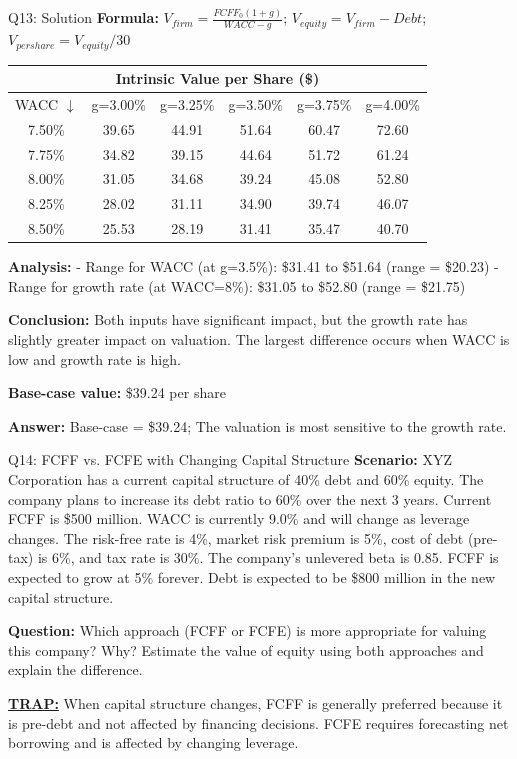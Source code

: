 \documentclass{beamer}
\renewcommand{\scriptsize}{\fontsize{6pt}{7pt}\selectfont}
\begin{document}
	\begin{frame}{Q13: Solution}
		\scriptsize
		\textbf{Formula:} $V_{firm} = \frac{FCFF_0(1+g)}{WACC-g}$; $V_{equity} = V_{firm} - Debt$; $V_{per share} = V_{equity}/30$
		
		\vspace{4pt}
		\begin{tabular}{c|c|c|c|c|c}
			\multicolumn{6}{c}{\textbf{Intrinsic Value per Share (\$)}} \\
			\hline
			WACC $\downarrow$ & g=3.00\% & g=3.25\% & g=3.50\% & g=3.75\% & g=4.00\% \\
			\hline
			7.50\% & 39.65 & 44.91 & 51.64 & 60.47 & 72.60 \\
			7.75\% & 34.82 & 39.15 & 44.64 & 51.72 & 61.24 \\
			8.00\% & 31.05 & 34.68 & 39.24 & 45.08 & 52.80 \\
			8.25\% & 28.02 & 31.11 & 34.90 & 39.74 & 46.07 \\
			8.50\% & 25.53 & 28.19 & 31.41 & 35.47 & 40.70 \\
		\end{tabular}
		
		\vspace{4pt}
		\textbf{Analysis:}
		- Range for WACC (at g=3.5\%): \$31.41 to \$51.64 (range = \$20.23)
		- Range for growth rate (at WACC=8\%): \$31.05 to \$52.80 (range = \$21.75)
		
		\vspace{2pt}
		\textbf{Conclusion:} Both inputs have significant impact, but the growth rate has slightly greater impact on valuation. The largest difference occurs when WACC is low and growth rate is high.
		
		\vspace{2pt}
		\textbf{Base-case value:} \$39.24 per share
		
		\textbf{Answer:} Base-case = \$39.24; The valuation is most sensitive to the growth rate.
	\end{frame}
	
	\begin{frame}{Q14: FCFF vs. FCFE with Changing Capital Structure}
		\scriptsize
		\textbf{Scenario:} XYZ Corporation has a current capital structure of 40\% debt and 60\% equity. The company plans to increase its debt ratio to 60\% over the next 3 years. Current FCFF is \$500 million. WACC is currently 9.0\% and will change as leverage changes. The risk-free rate is 4\%, market risk premium is 5\%, cost of debt (pre-tax) is 6\%, and tax rate is 30\%. The company's unlevered beta is 0.85. FCFF is expected to grow at 5\% forever. Debt is expected to be \$800 million in the new capital structure.
		
		\textbf{Question:} Which approach (FCFF or FCFE) is more appropriate for valuing this company? Why? Estimate the value of equity using both approaches and explain the difference.
		
		\vspace{2pt}
		\underline{\textbf{TRAP:}} When capital structure changes, FCFF is generally preferred because it is pre-debt and not affected by financing decisions. FCFE requires forecasting net borrowing and is affected by changing leverage.
	\end{frame}
	
\end{document}
